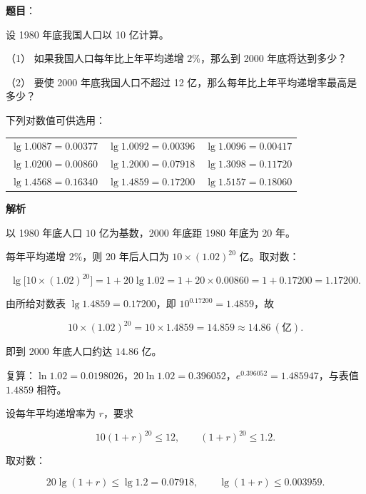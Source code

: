 \begin{answer}

\textbf{题目}：

设 1980 年底我国人口以 10 亿计算。

（1） 如果我国人口每年比上年平均递增 $2\%$，那么到 2000 年底将达到多少？

（2） 要使 2000 年底我国人口不超过 12 亿，那么每年比上年平均递增率最高是多少？

下列对数值可供选用：

\begin{center}
\begin{tabular}{lll}
\toprule
 &  &  \\
\midrule
$\lg 1.0087=0.00377$ & $\lg 1.0092=0.00396$ & $\lg 1.0096=0.00417$ \\
$\lg 1.0200=0.00860$ & $\lg 1.2000=0.07918$ & $\lg 1.3098=0.11720$ \\
$\lg 1.4568=0.16340$ & $\lg 1.4859=0.17200$ & $\lg 1.5157=0.18060$ \\
\bottomrule
\end{tabular}
\end{center}

\textbf{解析}

以 1980 年底人口 $10$ 亿为基数，2000 年底距 1980 年底为 $20$ 年。


每年平均递增 $2\%$，则 20 年后人口为 $10\times(1.02)^{20}$ 亿。取对数：

\nopagebreak[4]
\[
\lg\bigl[10\times(1.02)^{20}\bigr]=1+20\lg1.02=1+20\times0.00860=1+0.17200=1.17200.
\]

由所给对数表 $\lg1.4859=0.17200$，即 $10^{0.17200}=1.4859$，故

\nopagebreak[4]
\[
10\times(1.02)^{20}=10\times1.4859=14.859\approx14.86\ (\text{亿}).
\]

即到 2000 年底人口约达 $14.86$ 亿。

复算：$\ln1.02=0.0198026$，$20\ln1.02=0.396052$，$e^{0.396052}=1.485947$，与表值 $1.4859$ 相符。


设每年平均递增率为 $r$，要求

\nopagebreak[4]
\[
10(1+r)^{20}\leqslant12,
\qquad (1+r)^{20}\leqslant1.2.
\]

取对数：

\nopagebreak[4]
\[
20\lg(1+r)\leqslant\lg1.2=0.07918,
\qquad \lg(1+r)\leqslant0.003959.
\]


\end{answer}
